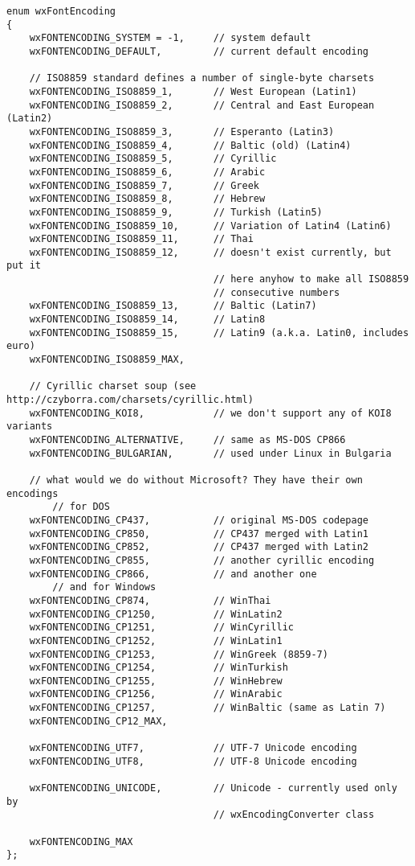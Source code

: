 \begin{verbatim}
enum wxFontEncoding
{
    wxFONTENCODING_SYSTEM = -1,     // system default
    wxFONTENCODING_DEFAULT,         // current default encoding

    // ISO8859 standard defines a number of single-byte charsets
    wxFONTENCODING_ISO8859_1,       // West European (Latin1)
    wxFONTENCODING_ISO8859_2,       // Central and East European (Latin2)
    wxFONTENCODING_ISO8859_3,       // Esperanto (Latin3)
    wxFONTENCODING_ISO8859_4,       // Baltic (old) (Latin4)
    wxFONTENCODING_ISO8859_5,       // Cyrillic
    wxFONTENCODING_ISO8859_6,       // Arabic
    wxFONTENCODING_ISO8859_7,       // Greek
    wxFONTENCODING_ISO8859_8,       // Hebrew
    wxFONTENCODING_ISO8859_9,       // Turkish (Latin5)
    wxFONTENCODING_ISO8859_10,      // Variation of Latin4 (Latin6)
    wxFONTENCODING_ISO8859_11,      // Thai
    wxFONTENCODING_ISO8859_12,      // doesn't exist currently, but put it
                                    // here anyhow to make all ISO8859
                                    // consecutive numbers
    wxFONTENCODING_ISO8859_13,      // Baltic (Latin7)
    wxFONTENCODING_ISO8859_14,      // Latin8
    wxFONTENCODING_ISO8859_15,      // Latin9 (a.k.a. Latin0, includes euro)
    wxFONTENCODING_ISO8859_MAX,

    // Cyrillic charset soup (see http://czyborra.com/charsets/cyrillic.html)
    wxFONTENCODING_KOI8,            // we don't support any of KOI8 variants
    wxFONTENCODING_ALTERNATIVE,     // same as MS-DOS CP866
    wxFONTENCODING_BULGARIAN,       // used under Linux in Bulgaria

    // what would we do without Microsoft? They have their own encodings
        // for DOS
    wxFONTENCODING_CP437,           // original MS-DOS codepage
    wxFONTENCODING_CP850,           // CP437 merged with Latin1
    wxFONTENCODING_CP852,           // CP437 merged with Latin2
    wxFONTENCODING_CP855,           // another cyrillic encoding
    wxFONTENCODING_CP866,           // and another one
        // and for Windows
    wxFONTENCODING_CP874,           // WinThai
    wxFONTENCODING_CP1250,          // WinLatin2
    wxFONTENCODING_CP1251,          // WinCyrillic
    wxFONTENCODING_CP1252,          // WinLatin1
    wxFONTENCODING_CP1253,          // WinGreek (8859-7)
    wxFONTENCODING_CP1254,          // WinTurkish
    wxFONTENCODING_CP1255,          // WinHebrew
    wxFONTENCODING_CP1256,          // WinArabic
    wxFONTENCODING_CP1257,          // WinBaltic (same as Latin 7)
    wxFONTENCODING_CP12_MAX,

    wxFONTENCODING_UTF7,            // UTF-7 Unicode encoding
    wxFONTENCODING_UTF8,            // UTF-8 Unicode encoding

    wxFONTENCODING_UNICODE,         // Unicode - currently used only by
                                    // wxEncodingConverter class

    wxFONTENCODING_MAX
};
\end{verbatim}

